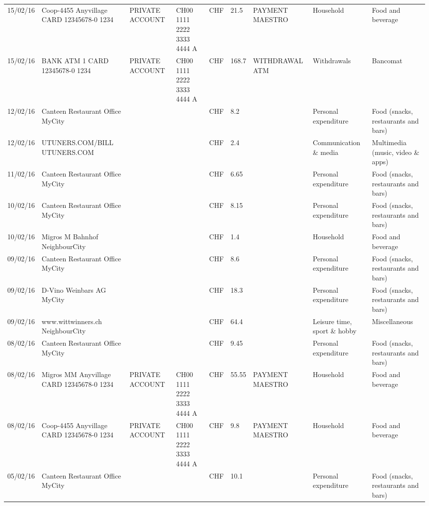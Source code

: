 \begin{landscape}
\begin{adjustwidth}{-2cm}{-2cm}
\begin{tiny}
\begin{longtable}{lp{4cm}llllp{3cm}ll}
		15/02/16 & Coop-4455 Anyvillage CARD 12345678-0 1234 & PRIVATE ACCOUNT & CH00 1111 2222 3333 4444 A & CHF   & 21.5  & PAYMENT MAESTRO & Household & Food and beverage \\
		15/02/16 & BANK ATM 1 CARD 12345678-0 1234 & PRIVATE ACCOUNT & CH00 1111 2222 3333 4444 A & CHF   & 168.7 & WITHDRAWAL ATM & Withdrawals & Bancomat \\
		12/02/16 & Canteen Restaurant Office      MyCity &       &       & CHF   & 8.2   &       & Personal expenditure & Food (snacks, restaurants and bars) \\
		12/02/16 & UTUNERS.COM/BILL          UTUNERS.COM &       &       & CHF   & 2.4   &       & Communication \& media & Multimedia (music, video \& apps) \\
		11/02/16 & Canteen Restaurant Office      MyCity &       &       & CHF   & 6.65  &       & Personal expenditure & Food (snacks, restaurants and bars) \\
		10/02/16 & Canteen Restaurant Office      MyCity &       &       & CHF   & 8.15  &       & Personal expenditure & Food (snacks, restaurants and bars) \\
		10/02/16 & Migros M Bahnhof         NeighbourCity &       &       & CHF   & 1.4   &       & Household & Food and beverage \\
		09/02/16 & Canteen Restaurant Office      MyCity &       &       & CHF   & 8.6   &       & Personal expenditure & Food (snacks, restaurants and bars) \\
		09/02/16 & D-Vino Weinbars AG       MyCity &       &       & CHF   & 18.3  &       & Personal expenditure & Food (snacks, restaurants and bars) \\
		09/02/16 & www.wittwinners.ch        NeighbourCity &       &       & CHF   & 64.4  &       & Leisure time, sport \& hobby & Miscellaneous \\
		08/02/16 & Canteen Restaurant Office      MyCity &       &       & CHF   & 9.45  &       & Personal expenditure & Food (snacks, restaurants and bars) \\
		08/02/16 & Migros MM Anyvillage CARD 12345678-0 1234 & PRIVATE ACCOUNT & CH00 1111 2222 3333 4444 A & CHF   & 55.55 & PAYMENT MAESTRO & Household & Food and beverage \\
		08/02/16 & Coop-4455 Anyvillage CARD 12345678-0 1234 & PRIVATE ACCOUNT & CH00 1111 2222 3333 4444 A & CHF   & 9.8   & PAYMENT MAESTRO & Household & Food and beverage \\
		05/02/16 & Canteen Restaurant Office      MyCity &       &       & CHF   & 10.1  &       & Personal expenditure & Food (snacks, restaurants and bars) \\

\end{longtable}
\end{tiny}
\end{adjustwidth}
\end{landscape}
